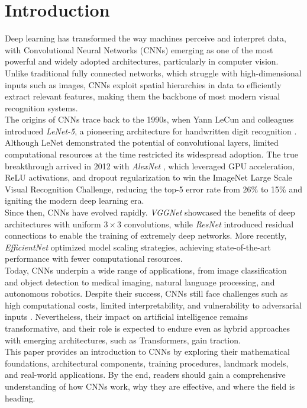 \chapter*{Introduction}

Deep learning has transformed the way machines perceive and interpret data, with Convolutional Neural Networks (CNNs) emerging as one of the most powerful and widely adopted architectures, particularly in computer vision. Unlike traditional fully connected networks, which struggle with high-dimensional inputs such as images, CNNs exploit spatial hierarchies in data to efficiently extract relevant features, making them the backbone of most modern visual recognition systems.
\\
The origins of CNNs trace back to the 1990s, when Yann LeCun and colleagues introduced \textit{LeNet-5}, a pioneering architecture for handwritten digit recognition \cite{lecun1998gradient}. Although LeNet demonstrated the potential of convolutional layers, limited computational resources at the time restricted its widespread adoption. The true breakthrough arrived in 2012 with \textit{AlexNet} \cite{krizhevsky2012imagenet}, which leveraged GPU acceleration, ReLU activations, and dropout regularization to win the ImageNet Large Scale Visual Recognition Challenge, reducing the top-5 error rate from 26\% to 15\% and igniting the modern deep learning era.
\\
Since then, CNNs have evolved rapidly. \textit{VGGNet} \cite{simonyan2014very} showcased the benefits of deep architectures with uniform $3 \times 3$ convolutions, while \textit{ResNet} \cite{he2015deep} introduced residual connections to enable the training of extremely deep networks. More recently, \textit{EfficientNet} \cite{tan2019efficientnet} optimized model scaling strategies, achieving state-of-the-art performance with fewer computational resources.
\\
Today, CNNs underpin a wide range of applications, from image classification and object detection to medical imaging, natural language processing, and autonomous robotics. Despite their success, CNNs still face challenges such as high computational costs, limited interpretability, and vulnerability to adversarial inputs \cite{li2021survey}. Nevertheless, their impact on artificial intelligence remains transformative, and their role is expected to endure even as hybrid approaches with emerging architectures, such as Transformers, gain traction.
\\
This paper provides an introduction to CNNs by exploring their mathematical foundations, architectural components, training procedures, landmark models, and real-world applications. By the end, readers should gain a comprehensive understanding of how CNNs work, why they are effective, and where the field is heading.